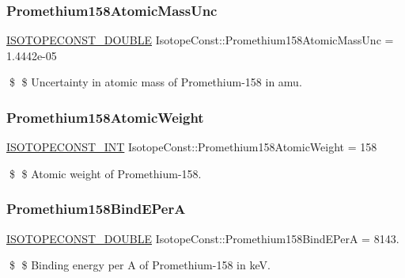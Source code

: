 \subsubsection{\texorpdfstring{Promethium158\+Atomic\+Mass\+Unc}{Promethium158AtomicMassUnc}}
{\footnotesize\ttfamily \mbox{\hyperlink{group___isotope_const-_macros_ga8f45a7272ce02c0b4c65c44636ed719a}{I\+S\+O\+T\+O\+P\+E\+C\+O\+N\+S\+T\+\_\+\+D\+O\+U\+B\+LE}} Isotope\+Const\+::\+Promethium158\+Atomic\+Mass\+Unc = 1.\+4442e-\/05}

\$ \$ Uncertainty in atomic mass of Promethium-\/158 in amu. \mbox{\label{group___isotope_const-_promethium-_pm158_gac27578f7c7a583481033b16723170860}} 
\subsubsection{\texorpdfstring{Promethium158\+Atomic\+Weight}{Promethium158AtomicWeight}}
{\footnotesize\ttfamily \mbox{\hyperlink{group___isotope_const-_macros_ga5f18360b3e99483a35c32d789e62621c}{I\+S\+O\+T\+O\+P\+E\+C\+O\+N\+S\+T\+\_\+\+I\+NT}} Isotope\+Const\+::\+Promethium158\+Atomic\+Weight = 158}

\$ \$ Atomic weight of Promethium-\/158. \mbox{\label{group___isotope_const-_promethium-_pm158_ga9485d885d9d8c2453610e14aa7577dc8}} 
\subsubsection{\texorpdfstring{Promethium158\+Bind\+E\+PerA}{Promethium158BindEPerA}}
{\footnotesize\ttfamily \mbox{\hyperlink{group___isotope_const-_macros_ga8f45a7272ce02c0b4c65c44636ed719a}{I\+S\+O\+T\+O\+P\+E\+C\+O\+N\+S\+T\+\_\+\+D\+O\+U\+B\+LE}} Isotope\+Const\+::\+Promethium158\+Bind\+E\+PerA = 8143.}

\$ \$ Binding energy per A of Promethium-\/158 in keV. \mbox{\label{group___isotope_const-_promethium-_pm158_gacf98f43e6d6f0bd043e4616759e9e5e1}} 
